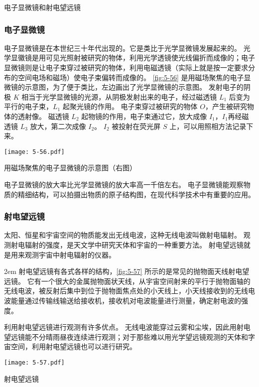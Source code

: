 \begin{Reading}{电子显微镜和射电望远镜}
\subsubsection*{电子显微镜}
电子显微镜是在本世纪三十年代出现的。它是类比于光学显微镜发展起来的。
光学显徽镜是用可见光照射被研究的物体，利用光学透镜使光线偏折而成像的；电子显微镜则是让电子束穿过被研究的物体，利用电磁透镜（实际上就是按一定要求分布的空间电场和磁场）使电子束偏转而成像的。
\cref{fig:5-56} 是用磁场聚焦的电子显微镜的示意图，为了便于类比，左边画出了光学显微镜的示意图。
发射电子的阴极 $K$ 相当于光学显微镜的光源，从阴极发射出来的电子，经过磁透镜 $L_1$ 后变为平行的电子束，$L_1$ 起聚光镜的作用。
电子束穿过被研究的物体 $O$，产生被研究物体的透射像。
磁透镜 $L_2$ 起物镜的作用，电子束通过它，放大成像 $I_1$，$I_1$再经磁透镜 $L_3$ 放大，第二次成像 $I_2$。
$I_2$ 被投射在荧光屏 $S$ 上，可以用照相方法记录下来。

\begin{figurehere}
  \begin{minipage}{\linewidth}\centering
    \texttt{[image: 5-56.pdf]}
    \caption{用磁场聚焦的电子显微镜的示意图（右图）}\label{fig:5-56}
  \end{minipage}
\end{figurehere}

电子显微镜的放大率比光学显微镜的放大率高一千倍左右。
电子显微镜能观察物质的精细结构，可以拍摄出物质的原子结构图，在现代科学技术中有重要的应用。

\subsubsection*{射电望远镜}
太阳、恒星和宇宙空间的物质能发出无线电波，这种无线电波叫做射电辐射。
观测射电辐射的强度，是天文学中研究天体和宇宙的一种重要方法。
射电望远镜就是用来观测宇宙中射电辐射的仪器。

\medskip\noindent
\begin{minipage}{0.62\linewidth}\parindent2em
射电望远镜有各式各样的结构，\cref{fig:5-57} 所示的是常见的抛物面天线射电望远镜。
它有一个很大的金属抛物面状天线，从宇宙空间射来的平行于抛物面轴的无线电波，被反射后集中到位于抛物面焦点处的小天线上，小天线接收到的无线电波能量通过传输线输送给接收机，接收机对电波能量进行测量，确定射电波的强度。

利用射电望远镜进行观测有许多优点。
无线电波能穿过云雾和尘埃，因此用射电望远镜能不分晴雨昼夜连续进行观测；对于那些难以用光学望远镜观测的天体和字宙空间，利用射电望远镜也可以进行研究。
\end{minipage}\hfill
\begin{minipage}{0.36\linewidth}
  \begin{figurehere}
    \begin{minipage}{\linewidth}\centering
      \texttt{[image: 5-57.pdf]}
      \caption{射电望远镜}\label{fig:5-57}
    \end{minipage}
  \end{figurehere}
\end{minipage}
\end{Reading}

